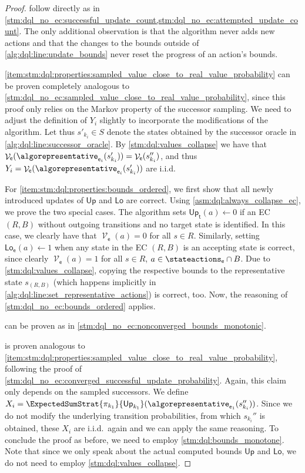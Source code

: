 \documentclass{theoretics}
\newcommand{\intersectionSym}{\cap}
\newcommand{\intersectionBin}{\mathbin{\intersectionSym}}
\newcommand{\intersection}{\intersectionBin}
\newcommand{\States}{S}
\newcommand{\strategy}{\pi}
\DeclareMathOperator{\val}{\mathcal{V}}
\newcommand{\upperbound}{\mathsf{Up}}
\newcommand{\lowerbound}{\mathsf{Lo}}
\newcommand{\algostep}{\mathsf{t}}
\newcommand{\algoepisode}{\mathsf{e}}
\begin{document}
\begin{proof}
	 follow directly as in \cref{stm:dql_no_ec:successful_update_count,stm:dql_no_ec:attempted_update_count}.
	The only additional observation is that the algorithm never adds new actions and that the changes to the bounds outside of \cref{alg:dql:line:update_bounds} never reset the progress of an action's bounds.

	\cref{item:stm:dql:properties:sampled_value_close_to_real_value_probability} can be proven completely analogous to \cref{stm:dql_no_ec:sampled_value_close_to_real_value_probability}, since this proof only relies on the Markov property of the successor sampling.
	We need to adjust the definition of $Y_i$ slightly to incorporate the modifications of the algorithm.
	Let thus $s'_{k_i} \in \States$ denote the states obtained by the successor oracle in \cref{alg:dql:line:successor_oracle}.
	By \cref{stm:dql:values_collapse} we have that $\val_\algoepisode(\algorepresentative_{\algoepisode_i}(s'_{k_i})) = \val_\algoepisode(s''_{k_i})$, and thus $Y_i = \val_\algoepisode(\algorepresentative_{\algoepisode_i}(s'_{k_i}))$ are i.i.d.

	For \cref{item:stm:dql:properties:bounds_ordered}, we first show that all newly introduced updates of $\upperbound$ and $\lowerbound$ are correct.
	Using \cref{asm:dql:always_collapse_ec}, we prove the two special cases.
	The algorithm sets $\upperbound_\algostep(a) \gets 0$ if an EC $(R, B)$ without outgoing transitions and no target state is identified.
	In this case, we clearly have that $\val_\algoepisode(a) = 0$ for all $s \in R$.
	Similarly, setting $\lowerbound_\algoepisode(a) \gets 1$ when any state in the EC $(R, B)$ is an accepting state is correct, since clearly $\val_\algoepisode(a) = 1$ for all $s \in R$, $a \in \stateactions_\algoepisode \intersection B$.
	Due to \cref{stm:dql:values_collapse}, copying the respective bounds to the representative state $s_{(R, B)}$ (which happens implicitly in \cref{alg:dql:line:set_representative_actions}) is correct, too.
	Now, the reasoning of \cref{stm:dql_no_ec:bounds_ordered} applies.

	 can be proven as in \cref{stm:dql_no_ec:nonconverged_bounds_monotonic}.

	 is proven analogous to \cref{item:stm:dql:properties:sampled_value_close_to_real_value_probability}, following the proof of \cref{stm:dql_no_ec:converged_successful_update_probability}.
	Again, this claim only depends on the sampled successors.
	We define $X_i = \ExpectedSumStrat{\strategy_{k_1}}{\upperbound_{k_1}}(\algorepresentative_{\algoepisode_1}(s_{k_i}''))$.
	Since we do not modify the underlying transition probabilities, from which $s_{k_i}''$ is obtained, these $X_i$ are i.i.d.\ again and we can apply the same reasoning.
	To conclude the proof as before, we need to employ \cref{stm:dql:bounds_monotone}.
	Note that since we only speak about the actual computed bounds $\upperbound$ and $\lowerbound$, we do not need to employ \cref{stm:dql:values_collapse}.


\end{proof}
\end{document}
